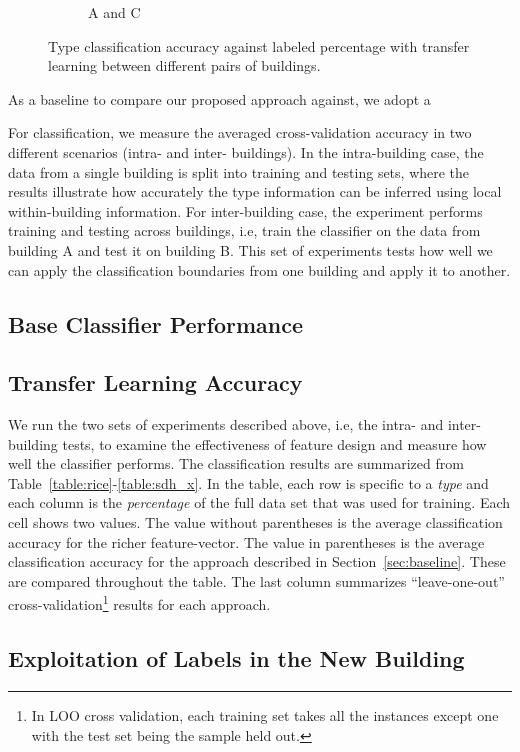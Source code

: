 \begin{figure}[ht!]
\begin{subfigure}{0.32\textwidth}
                \caption{A and C}
  \end{subfigure}
\caption{Type classification accuracy against labeled percentage with transfer learning between different pairs of buildings.}
\label{fig:tl_acc}
\end{figure}


As a baseline to compare our proposed approach against, we adopt a 


For classification, we measure the averaged cross-validation accuracy in two different scenarios (intra- and inter- buildings). In the intra-building case, the 
data from a single building is split into training and testing sets, where the results illustrate how accurately the type information can be inferred using local 
within-building information. For inter-building case, the experiment performs training and testing across buildings, i.e, train the classifier on the data from building A 
and test it on building B.  
This set of experiments tests how well we can apply the classification boundaries from one building and apply it to another.

\subsection{Base Classifier Performance}


\subsection{Transfer Learning Accuracy}
We run the two sets of experiments described above, i.e, the intra- and inter- building tests, to examine the effectiveness of feature design and measure how well 
the classifier performs. The classification results are summarized from Table~\ref{table:rice}-\ref{table:sdh_x}. %
In the table, each row is specific to a \emph{type} and each column is the \emph{percentage} of the full data set that was used for training.
Each cell shows two values.  The value without parentheses is the average classification accuracy for the richer feature-vector. 
The value in parentheses is the average classification accuracy for the approach described in 
Section~\ref{sec:baseline}. These are compared throughout the table.
The last column summarizes ``leave-one-out'' cross-validation\footnote{In LOO cross validation, each training set takes all the instances except one with the test set being 
the sample held out.} results for each approach.

\subsection{Exploitation of Labels in the New Building}
